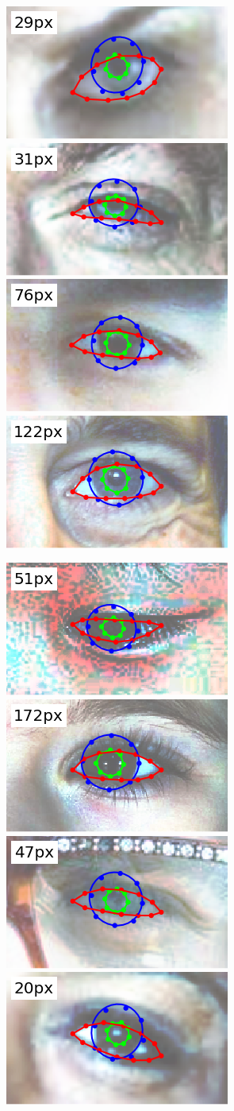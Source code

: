\begin{figure}
    \centering
    \includegraphics[width=0.244\columnwidth]{figs/wild_ldmks_examples/idx_550.png}\hfill
    \includegraphics[width=0.244\columnwidth]{figs/wild_ldmks_examples/idx_560.png}\hfill
    \includegraphics[width=0.244\columnwidth]{figs/wild_ldmks_examples/idx_799.png}\hfill
    \includegraphics[width=0.244\columnwidth]{figs/wild_ldmks_examples/idx_721.png}
    \par \vspace{0.1em}
    \includegraphics[width=0.244\columnwidth]{figs/wild_ldmks_examples/idx_1013.png}\hfill
    \includegraphics[width=0.244\columnwidth]{figs/wild_ldmks_examples/idx_1002.png}\hfill
    \includegraphics[width=0.244\columnwidth]{figs/wild_ldmks_examples/idx_765.png}\hfill
    \includegraphics[width=0.244\columnwidth]{figs/wild_ldmks_examples/idx_508.png}

\end{figure}
